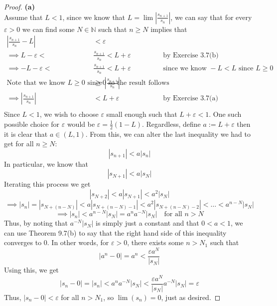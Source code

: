 \documentclass[10pt,a4paper]{article}
\theoremstyle{definition}
\begin{document}
\begin{proof}{\textbf{(a)}}
\\Assume that $L < 1$, since we know that $\displaystyle L = \lim \left|\frac{s_{n + 1}}{s_n}\right|$, we can say that for every $\varepsilon > 0$ we can find some $N \in \mathbb{N}$ such that $n \geq N$ implies that 
\begin{align*}
\left|\frac{s_{n + 1}}{s_n} - L\right| &< \varepsilon\\
\implies L - \varepsilon < &\frac{s_{n + 1}}{s_n} < L + \varepsilon &\text{by Exercise 3.7(b)}\\
\implies -L - \varepsilon < &\frac{s_{n + 1}}{s_n} < L + \varepsilon &\text{since we know } -L < L \text{ since }L \geq 0\\
\text{Note that we know } L \geq 0 \text{ since } \left|\frac{s_{n + 1}}{s_n}\right| &\geq 0 \text{ so the result follows from Exercise 8.9(a)}\\
\implies \left|\frac{s_{n + 1}}{s_n}\right| &< L + \varepsilon &\text{by Exercise 3.7(a)}\\
\end{align*}
Since $L < 1$, we wish to choose $\varepsilon$ small enough such that $L + \varepsilon < 1$. One such possible choice for $\varepsilon$ would be $\varepsilon = \frac{1}{2}(1 - L)$. Regardless, define $a := L + \varepsilon$ then it is clear that $a \in (L, 1)$. From this, we can alter the last inequality we had to get for all $n \geq N$:
\[|s_{n + 1}| < a|s_n|\]
In particular, we know that
\[|s_{N + 1}| < a|s_N|\]
Iterating this process we get
\[|s_{N + 2}| < a|s_{N + 1}| < a^2 |s_N|\]
\[\implies |s_n| = |s_{N + (n - N)}| < a|s_{N + (n - N) - 1}| < a^2|s_{N + (n - N) - 2}| < \ldots < a^{n - N}|s_N| \]
\[\implies |s_n| < a^{n - N}|s_N| = a^n a^{-N}|s_N| \quad \text{for all } n > N\]
Thus, by noting that $a^{-N}|s_N|$ is simply just a constant and that $0 < a < 1$, we can use Theorem 9.7(b) to say that the right hand side of this inequality converges to 0. In other words, for $\varepsilon > 0$, there exists some $n > N_1$ such that 
\[|a^n - 0| = a^n < \frac{\varepsilon a^N}{|s_N|}\]
Using this, we get
\[|s_n - 0| = |s_n| < a^n a^{-N}|s_N| < \frac{\varepsilon a^N}{|s_N|} a^{-N}|s_N| = \varepsilon\]
Thus, $|s_n - 0| < \varepsilon$ for all $n > N_1$, so $\lim(s_n) = 0$, just as desired. 
\end{proof}
\end{document}

